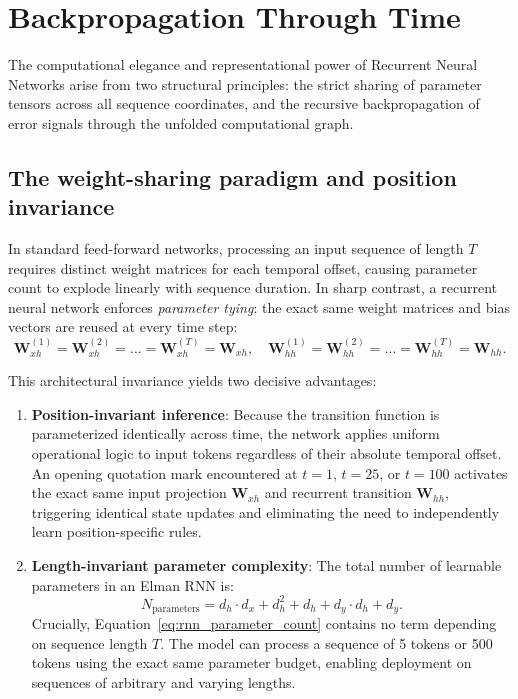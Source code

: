 \documentclass[../../../main.tex]{subfiles}
\begin{document}
\clearpage
\section{Backpropagation Through Time}
\label{sec:rnn_weight_sharing_bptt}

The computational elegance and representational power of Recurrent Neural Networks arise from two structural principles: the strict sharing of parameter tensors across all sequence coordinates, and the recursive backpropagation of error signals through the unfolded computational graph.

\subsection{The weight-sharing paradigm and position invariance}
\label{subsec:rnn_weight_sharing}

In standard feed-forward networks, processing an input sequence of length $T$ requires distinct weight matrices for each temporal offset, causing parameter count to explode linearly with sequence duration. In sharp contrast, a recurrent neural network enforces \textit{parameter tying}: the exact same weight matrices and bias vectors are reused at every time step:
\begin{equation}
\mathbf{W}_{xh}^{(1)} = \mathbf{W}_{xh}^{(2)} = \dots = \mathbf{W}_{xh}^{(T)} = \mathbf{W}_{xh}, \quad \mathbf{W}_{hh}^{(1)} = \mathbf{W}_{hh}^{(2)} = \dots = \mathbf{W}_{hh}^{(T)} = \mathbf{W}_{hh}.
\end{equation}

This architectural invariance yields two decisive advantages:
\begin{enumerate}
    \item \textbf{Position-invariant inference}: Because the transition function is parameterized identically across time, the network applies uniform operational logic to input tokens regardless of their absolute temporal offset. An opening quotation mark encountered at $t=1$, $t=25$, or $t=100$ activates the exact same input projection $\mathbf{W}_{xh}$ and recurrent transition $\mathbf{W}_{hh}$, triggering identical state updates and eliminating the need to independently learn position-specific rules.
    \item \textbf{Length-invariant parameter complexity}: The total number of learnable parameters in an Elman RNN is:
    \begin{equation}
    N_{\text{parameters}} = d_h \cdot d_x + d_h^2 + d_h + d_y \cdot d_h + d_y.
    \label{eq:rnn_parameter_count}
    \end{equation}
    Crucially, Equation~\ref{eq:rnn_parameter_count} contains no term depending on sequence length $T$. The model can process a sequence of 5 tokens or 500 tokens using the exact same parameter budget, enabling deployment on sequences of arbitrary and varying lengths.
\end{enumerate}
\end{document}
